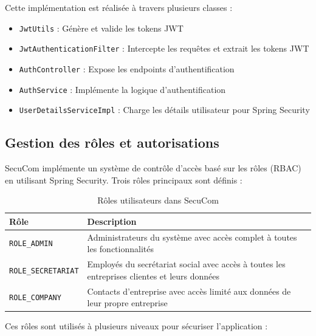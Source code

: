 \vspace{0.5cm}

Cette implémentation est réalisée à travers plusieurs classes :

\begin{itemize}[leftmargin=*,label=\textcolor{darkgray}{$\bullet$},itemsep=0.3em]
  \item \texttt{JwtUtils} : Génère et valide les tokens JWT
  \item \texttt{JwtAuthenticationFilter} : Intercepte les requêtes et extrait les tokens JWT
  \item \texttt{AuthController} : Expose les endpoints d'authentification
  \item \texttt{AuthService} : Implémente la logique d'authentification
  \item \texttt{UserDetailsServiceImpl} : Charge les détails utilisateur pour Spring Security
\end{itemize}

\subsection{Gestion des rôles et autorisations}

SecuCom implémente un système de contrôle d'accès basé sur les rôles (RBAC) en utilisant Spring Security. Trois rôles principaux sont définis :

\vspace{0.5cm}

\begin{table}[H]
\centering
\begin{tabular}{|l|p{10cm}|}
\hline
\textbf{Rôle} & \textbf{Description} \\
\hline
\texttt{ROLE\_ADMIN} & Administrateurs du système avec accès complet à toutes les fonctionnalités \\
\hline
\texttt{ROLE\_SECRETARIAT} & Employés du secrétariat social avec accès à toutes les entreprises clientes et leurs données \\
\hline
\texttt{ROLE\_COMPANY} & Contacts d'entreprise avec accès limité aux données de leur propre entreprise \\
\hline
\end{tabular}
\caption{Rôles utilisateurs dans SecuCom}
\end{table}

\vspace{0.5cm}

Ces rôles sont utilisés à plusieurs niveaux pour sécuriser l'application :


